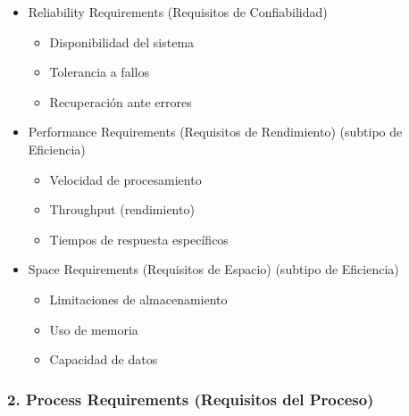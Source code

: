 \begin{itemize}
\begin{itemize}
        \end{itemize}



        \item Reliability Requirements (Requisitos de Confiabilidad)
        \begin{itemize}

            \item Disponibilidad del sistema

            \item Tolerancia a fallos

            \item Recuperación ante errores

        \end{itemize}



        \item Performance Requirements (Requisitos de Rendimiento) (subtipo de Eficiencia)
        \begin{itemize}

            \item Velocidad de procesamiento

            \item Throughput (rendimiento)

            \item Tiempos de respuesta específicos

        \end{itemize}



        \item Space Requirements (Requisitos de Espacio) (subtipo de Eficiencia)
        \begin{itemize}

            \item Limitaciones de almacenamiento

            \item Uso de memoria

            \item Capacidad de datos

        \end{itemize}


    \end{itemize}

    \subsubsection{2. Process Requirements (Requisitos del Proceso)}

